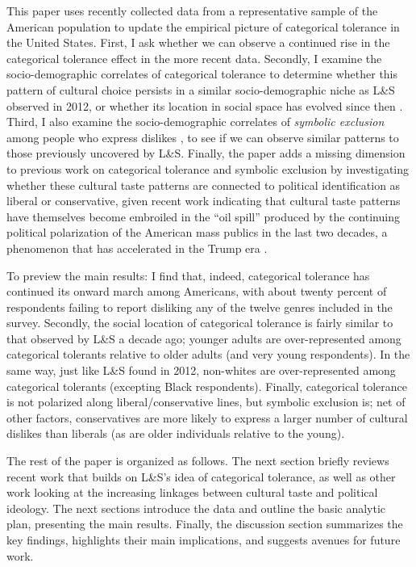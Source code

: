 \documentclass[12pt]{article}
\begin{document}
This paper uses recently collected data from a representative sample of the American population to update the empirical picture of categorical tolerance in the United States. First, I ask whether we can observe a continued rise in the categorical tolerance effect in the more recent data. Secondly, I examine the socio-demographic correlates of categorical tolerance to determine whether this pattern of cultural choice persists in a similar socio-demographic niche as L\&S observed in 2012, or whether its location in social space has evolved since then \citep{mcpherson2004blau-9fe}. Third, I also examine the socio-demographic correlates of \textit{symbolic exclusion} among people who express dislikes \citep{bryson1996anything-311}, to see if we can observe similar patterns to those previously uncovered by L\&S. Finally, the paper adds a missing dimension to previous work on categorical tolerance and symbolic exclusion by investigating whether these cultural taste patterns are connected to political identification as liberal or conservative, given recent work indicating that cultural taste patterns have themselves become embroiled in the ``oil spill'' produced by the continuing political polarization of the American mass publics in the last two decades, a phenomenon that has accelerated in the Trump era \citep{dellaposta2020pluralistic-ed4, rawlings2023polarization-0af}.

To preview the main results: I find that, indeed, categorical tolerance has continued its onward march among Americans, with about twenty percent of respondents failing to report disliking any of the twelve genres included in the survey. Secondly, the social location of categorical tolerance is fairly similar to that observed by L\&S a decade ago; younger adults are over-represented among categorical tolerants relative to older adults (and very young respondents). In the same way, just like L\&S found in 2012, non-whites are over-represented among categorical tolerants (excepting Black respondents). Finally, categorical tolerance is not polarized along liberal/conservative lines, but symbolic exclusion is; net of other factors, conservatives are more likely to express a larger number of cultural dislikes than liberals (as are older individuals relative to the young). 

The rest of the paper is organized as follows. The next section briefly reviews recent work that builds on L\&S's idea of categorical tolerance, as well as other work looking at the increasing linkages between cultural taste and political ideology. The next sections introduce the data and outline the basic analytic plan, presenting the main results. Finally, the discussion section summarizes the key findings, highlights their main implications, and suggests avenues for future work. 
\end{document}
